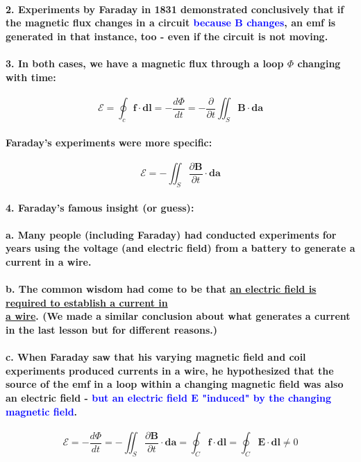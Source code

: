 \documentclass{article}
\begin{document}
\paragraph{2. Experiments by Faraday in 1831 demonstrated conclusively that if the magnetic flux changes in a circuit \textcolor{blue}{because $\boldsymbol{B}$ changes}, an emf is generated in that instance, too - even if the circuit is not moving.}
\paragraph{3. In both cases, we have a magnetic flux through a loop $\Phi$ changing with time:}
\begin{equation*}
    \mathcal{E}=\oint_c\boldsymbol{f}\cdot\boldsymbol{dl}=-\frac{d\Phi}{dt}=-\frac{\partial}{\partial t}\iint_S\boldsymbol{B}\cdot\boldsymbol{da}
\end{equation*}
\paragraph{Faraday's experiments were more specific:}
\begin{equation*}
\mathcal{E}=-\iint_S\frac{\partial\boldsymbol{B}}{\partial t}\cdot \boldsymbol{da}
\end{equation*}
\paragraph{4. Faraday's famous insight (or guess):}
\paragraph{\indent a. Many people (including Faraday) had conducted experiments for years using the voltage (and electric field) from a battery to generate a current in a wire.}
\paragraph{\indent b. The common wisdom had come to be that \underline{an electric field is required to establish a current in}\\\underline{ a wire}. (We made a similar conclusion about what generates a current in the last lesson but for different reasons.)}
\paragraph{\indent c. When Faraday saw that his varying magnetic field and coil experiments produced currents in a wire, he hypothesized that the source of the emf in a loop within a changing magnetic field was also an electric field -\textcolor{blue}{ but an electric field $\boldsymbol{E}$ "induced" by the changing magnetic field}.}
\begin{equation*}
    \mathcal{E}=-\frac{d\Phi}{dt}=-\iint_S\frac{\partial\boldsymbol{B}}{\partial t}\cdot \boldsymbol{da}=\oint_C\boldsymbol{f}\cdot\boldsymbol{dl}=\oint_C\boldsymbol{E}\cdot\boldsymbol{dl}\neq 0
\end{equation*}
\end{document}
